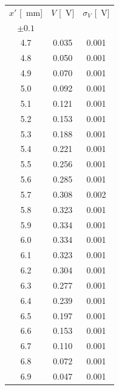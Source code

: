 \documentclass[10pt,oneside,a4paper]{article}
\begin{document}
\begin{minipage}{0.33\linewidth}
\begin{center}
\begin{tabular}{c|c|c}
$x'$ [\SI{}{mm}] & $V$ [\SI{}{V}] & $\sigma_V$ [\SI{}{V}] \\
 $\pm 0.1$ & & \\
\hline
  4.7 & 0.035 & 0.001 \\
  4.8 & 0.050 & 0.001 \\
  4.9 & 0.070 & 0.001 \\
  5.0 & 0.092 & 0.001 \\
  5.1 & 0.121 & 0.001 \\
  5.2 & 0.153 & 0.001 \\
  5.3 & 0.188 & 0.001 \\
  5.4 & 0.221 & 0.001 \\
  5.5 & 0.256 & 0.001 \\
  5.6 & 0.285 & 0.001 \\
  5.7 & 0.308 & 0.002 \\
  5.8 & 0.323 & 0.001 \\
  5.9 & 0.334 & 0.001 \\
  6.0 & 0.334 & 0.001 \\
  6.1 & 0.323 & 0.001 \\
  6.2 & 0.304 & 0.001 \\
  6.3 & 0.277 & 0.001 \\
  6.4 & 0.239 & 0.001 \\
  6.5 & 0.197 & 0.001 \\
  6.6 & 0.153 & 0.001 \\
  6.7 & 0.110 & 0.001 \\
  6.8 & 0.072 & 0.001 \\
  6.9 & 0.047 & 0.001 \\
\hline
\end{tabular}
\end{center}
\end{minipage}
\end{document}

